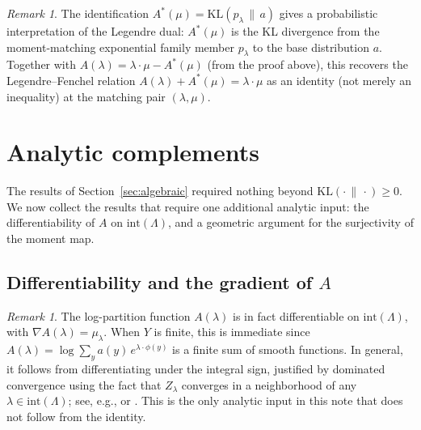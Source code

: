 \documentclass[11pt, a4paper, 
onecolumn, 
showabstract]{naverlabseurope-onecol-flex}
\theoremstyle{definition}
\theoremstyle{remark}
\newtheorem{remark}[theorem]{Remark}
\newcommand{\KL}[2]{\mathrm{KL}\!\left(#1 \,\|\, #2\right)}
\begin{document}
\begin{remark}
The identification $A^*(\mu) = \KL{p_\lambda}{a}$ gives a probabilistic
interpretation of the Legendre dual: $A^*(\mu)$ is the KL divergence from
the moment-matching exponential family member $p_\lambda$ to the base
distribution $a$.
Together with $A(\lambda) = \lambda \cdot \mu - A^*(\mu)$ (from the proof above), this recovers the Legendre--Fenchel relation $A(\lambda) + A^*(\mu) = \lambda \cdot \mu$ as an identity (not merely an inequality) at the matching pair $(\lambda, \mu)$.
\end{remark}

\section{Analytic complements}\label{sec:logpartition}

The results of Section~\ref{sec:algebraic} required nothing beyond $\KL{\cdot}{\cdot} \geq 0$.
We now collect the results that require one additional analytic input: the differentiability of $A$ on $\mathrm{int}(\Lambda)$, and a geometric argument for the surjectivity of the moment map.

\subsection{Differentiability and the gradient of $A$}\label{sec:gradient}

\begin{remark}\label{rem:gradient}
The log-partition function $A(\lambda)$ is in fact differentiable on $\mathrm{int}(\Lambda)$, with $\nabla A(\lambda) = \mu_\lambda$.
When $Y$ is finite, this is immediate since $A(\lambda) = \log \sum_y a(y)\, e^{\lambda\cdot\phi(y)}$ is a finite sum of smooth functions.
In general, it follows from differentiating under the integral sign, justified by dominated convergence using the fact that $Z_\lambda$ converges in a neighborhood of any $\lambda \in \mathrm{int}(\Lambda)$; see, e.g., \cite[Chapter~2]{Brown1986} or \cite[Proposition~3.1]{WainwrightJordan2008}.
This is the only analytic input in this note that does not follow from the identity.
\end{remark}

\end{document}
